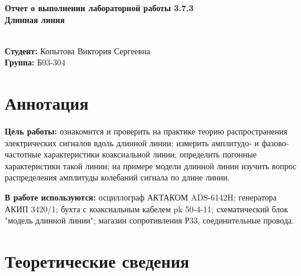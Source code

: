 \documentclass[a4paper,12 pt]{article}
\begin{document}
    \begin{titlepage}
    \begin{center}
        \vspace{4cm}
        \huge {\textbf{Отчет о выполнении лабораторной работы 3.7.3 }}
        {} \\
        \vspace{1cm}
        \Large {\textbf{Длинная линия}} \\
        \Large {\textbf{}} \\
        \vspace{10cm}
        \begin{flushright}
        \begin{minipage}{.45\textwidth}
        \normalsize{\textbf{Студент:} Копытова Виктория Сергеевна}\\
        \textbf{Группа:} Б03-304\\
        \end{minipage}
        \end{flushright}   
    \end{center}
    \end{titlepage}
\newpage
 
\section{Аннотация}
\textbf{Цель работы:} ознакомится и проверить на практике теорию распространения
электрических сигналов вдоль длинной линии; измерить амплитудо- и фазово-частотные
характеристики коаксиальной линии; определить погонные характеристики такой
линии; на примере модели длинной линии изучить вопрос распределения амплитуды
колебаний сигнала по длине линии.

\textbf{В работе используются:} осциллограф АКТАКОМ ADS-6142H; генератора АКИП 3420/1; бухта с
коаксиальным кабелем pk 50-4-11; схематический блок "модель длинной линии"; магазин
сопротивления Р33, соединительные провода.
	

\section{Теоретические сведения}
\end{document}
